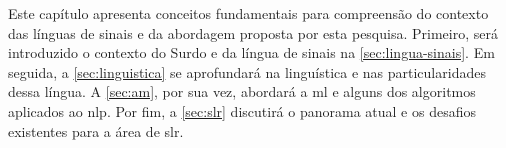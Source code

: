 Este capítulo apresenta conceitos fundamentais para compreensão do contexto das línguas de sinais e da abordagem proposta por esta pesquisa.
Primeiro, será introduzido o contexto do Surdo e da língua de sinais na \autoref{sec:lingua-sinais}.
Em seguida, a \autoref{sec:linguistica} se aprofundará na linguística e nas particularidades dessa língua.
A \autoref{sec:am}, por sua vez, abordará a \acrlong{ml} e alguns dos algoritmos aplicados ao \acrlong{nlp}.
Por fim, a \autoref{sec:slr} discutirá o panorama atual e os desafios existentes para a área de \acrlong{slr}.







